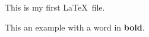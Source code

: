 \documentclass[10pt, paper=a4, abstracton]{scrartcl}
\begin{document}
This is my first \LaTeX\ file. 

This an example with a word in \textbf{bold}.
\end{document}
